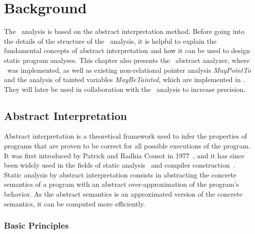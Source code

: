 \chapter{Background}\label{chapter:background}

The \cpo\ analysis is based on the abstract interpretation method.
Before going into the details of the structure of the \cpo\ analysis,
it is helpful to explain the fundamental concepts of abstract interpretation and how it can be used to design static program analyses.
This chapter also presents the \goblint\ abstract analyzer, where \cpo\ was implemented, as well as existing non-relational pointer analysis \emph{MayPointTo} and the analysis of tainted variables \emph{MayBeTainted}, which are implemented in \goblint.
They will later be used in collaboration with the \cpo\ analysis to increase precision.

\section{Abstract Interpretation}

Abstract interpretation is a theoretical framework used to infer the properties of programs that are proven to be correct for all possible executions of the program.
It was first introduced by Patrick and Radhia Cousot in 1977~\cite{ai,aibook}, and it has since been widely used in the fields of static analysis~\cite{ai-static-analysis} and compiler construction~\cite{ai-compiler-design}.
Static analysis by abstract interpretation consists in abstracting the concrete
semantics of a program with an abstract over-approximation of the program's behavior.
As the abstract semantics is an approximated version of the concrete semantics,
it can be computed more efficiently.

\subsection{Basic Principles}


